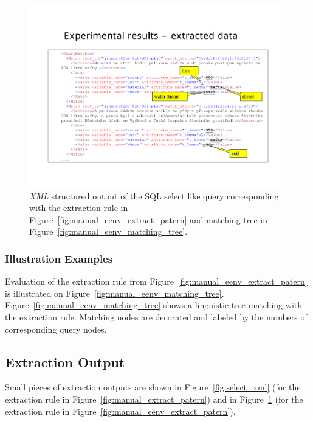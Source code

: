 \begin{figure}
	\centering
		\includegraphics[angle=-90, width=0.7\hsize]{eenv_results}
	\caption{\emph{XML} structured output of the SQL select like query corresponding with the extraction rule in Figure~\ref{fig:manual_eenv_extract_patern} and matching tree in Figure~\ref{fig:manual_eenv_matching_tree}.}
	\label{fig:manual_eenv_results}
\end{figure}























\subsubsection{Illustration Examples}



Evaluation of the extraction rule from Figure~\ref{fig:manual_eenv_extract_patern} is illustrated on Figure~\ref{fig:manual_eenv_matching_tree}. Figure~\ref{fig:manual_eenv_matching_tree} shows a linguistic tree matching with the extraction rule. Matching nodes are decorated and labeled by the numbers of corresponding query nodes.



\subsection{Extraction Output} \label{sec:manual_impl_output}

Small pieces of extraction outputs are shown in Figure~\ref{fig:select_xml} (for the extraction rule in Figure~\ref{fig:manual_extract_patern}) and in Figure~\ref{fig:manual_eenv_results} (for the extraction rule in Figure~\ref{fig:manual_eenv_extract_patern}). 

